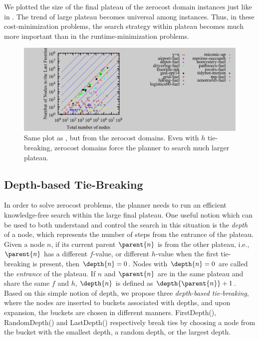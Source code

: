 We plotted the size of the final plateau of the zerocost domain instances just like in
. The trend of large plateau becomes universal among
instances. Thus, in these cost-minimization problems, the search strategy within
plateau becomes much more important than in the
runtime-minimization problems.

\begin{figure}[tb]
 \centering {}
  \includegraphics{tables/aaai16-frontier/zerocost/lmcut_frontier-front.pdf}
  \caption{Same plot as , but from the zerocost
  domains. Even with $h$ tie-breaking, zerocost domains force the planner
  to search much larger plateau.}
 \label{plateau-zerocost}
\end{figure}



\subsection{Depth-based Tie-Breaking}

In order to solve zerocost problems, the planner needs to run an
efficient knowledge-free search within the large final plateau.
One useful notion which can be used to both understand and control the
search in this situation is the \emph{depth} of a node, which represents
the number of steps from the entrance of the plateau.  Given a node $n$,
if its current parent $\parent{n}$ is from the other plateau, i.e.,
$\parent{n}$ has a different $f$-value, or different $h$-value when the
first tie-breaking is present, then $\depth{n} = 0$. Nodes with
$\depth{n} = 0$ are called the \emph{entrance} of the plateau.  If $n$
and $\parent{n}$ are in the same plateau and share the same $f$ and $h$,
$\depth{n}$ is defined as $\depth{\parent{n}} + 1$.  Based on this
simple notion of depth, we propose three \emph{depth-based
tie-breaking}, where the nodes are inserted to buckets associated with
depths, and upon expansion, the buckets are chosen in different manners.
FirstDepth(\fd), RandomDepth(\rd) and LastDepth(\ld) respectively break
ties by choosing a node from the bucket with the smallest depth, a
random depth, or the largest depth.

